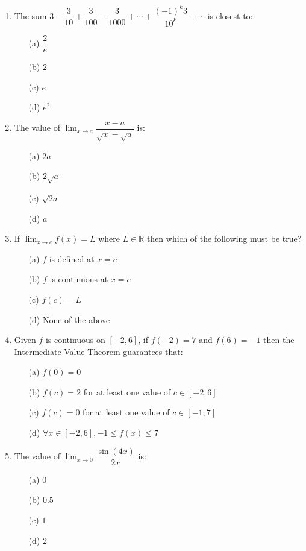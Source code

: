 \documentclass[12pt]{book}
\begin{document}
\begin{enumerate}

\item The sum $3-\dfrac{3}{10}+\dfrac{3}{100}-\dfrac{3}{1000} + \cdots + \dfrac{(-1)^k3}{10^k} + \cdots$ is closest to:
\begin{enumerate}
\item[(a)] $\dfrac{2}{e}$
\item[(b)] $2$
\item[(c)] $e$
\item[(d)] $e^2$
\end{enumerate}

\item The value of $\lim_{x\to a}\limits \dfrac{x-a}{\sqrt{x} - \sqrt{a}}$ is:
\begin{enumerate}
\item[(a)] $2a$
\item[(b)] $2\sqrt{a}$
\item[(c)] $\sqrt{2a}$
\item[(d)] $a$
\end{enumerate}

\item If $\lim_{x\to c}\limits f(x) = L$ where $L \in \mathbb{R}$ then which of the following must be true?
\begin{enumerate}
\item[(a)] $f$ is defined at $x=c$
\item[(b)] $f$ is continuous at $x=c$
\item[(c)] $f(c) = L$
\item[(d)] None of the above
\end{enumerate}

\item Given $f$ is continuous on $[-2,6]$, if $f(-2)=7$ and $f(6)=-1$ then the Intermediate Value Theorem guarantees that:
\begin{enumerate}
\item[(a)] $f(0)=0$
\item[(b)] $f(c)=2$ for at least one value of $c \in [-2,6]$
\item[(c)] $f(c)=0$ for at least one value of $c \in [-1,7]$
\item[(d)] $\forall x \in [-2,6], -1 \le f(x) \le 7$
\end{enumerate}

\item The value of $\lim_{x\to 0}\limits \dfrac{\sin(4x)}{2x}$ is:
\begin{enumerate}
\item[(a)] $0$
\item[(b)] $0.5$
\item[(c)] $1$
\item[(d)] $2$
\end{enumerate}


\end{enumerate}
\end{document}
